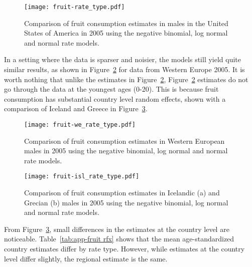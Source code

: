     \begin{figure}[h]
        \begin{center}
            \texttt{[image: fruit-rate\_type.pdf]}
            \caption{Comparison of fruit consumption estimates in
              males in the United States of America in 2005 using the
              negative binomial, log normal and normal rate models.}
            \label{fig:app-fruit rate type}
        \end{center}
    \end{figure}

In a setting where the data is sparser and noisier, the
models still yield quite similar results, as shown in Figure~\ref{fig:app-fruit europe}
for data from Western Europe 2005.  It is worth nothing that unlike
the estimates in Figure~\ref{fig:app-fruit europe},
Figure~\ref{fig:app-fruit europe} estimates do not go through the
data at the youngest ages (0-20).  This is because fruit consumption has
substantial country level random effects, shown with a comparison of
Iceland and Greece in Figure~\ref{fig:app-fruit countries}.

    \begin{figure}[h]
        \begin{center}
            \texttt{[image: fruit-we\_rate\_type.pdf]}
            \caption{Comparison of fruit consumption estimates in
              Western European males in 2005 using the
              negative binomial, log normal and normal rate models.}
            \label{fig:app-fruit europe}
        \end{center}
    \end{figure}

    \begin{figure}[h]
        \begin{center}
            \texttt{[image: fruit-isl\_rate\_type.pdf]}
            \caption{Comparison of fruit consumption estimates in
              Icelandic (a) and Grecian (b) males in 2005 using the
              negative binomial, log normal and normal rate models.}
            \label{fig:app-fruit countries}
        \end{center}
    \end{figure}

From Figure~\ref{fig:app-fruit countries},
small differences in the estimates at the country level are noticeable.
Table~\ref{tab:app-fruit rfx} shows that the mean age-standardized
country estimates differ by rate type.  However, while estimates at
the country level differ slightly, the regional estimate is the same.


